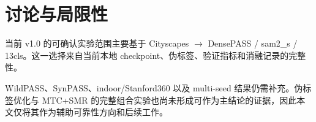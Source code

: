 \section{讨论与局限性}
\label{sec:discussion}

当前 v1.0 的可确认实验范围主要基于 Cityscapes $\rightarrow$ DensePASS / sam2\_s / 13cls。这一选择来自当前本地 checkpoint、伪标签、验证指标和消融记录的完整性。

WildPASS、SynPASS、indoor/Stanford360 以及 multi-seed 结果仍需补充。伪标签优化与 MTC+SMR 的完整组合实验也尚未形成可作为主结论的证据，因此本文仅将其作为辅助可靠性方向和后续工作。
